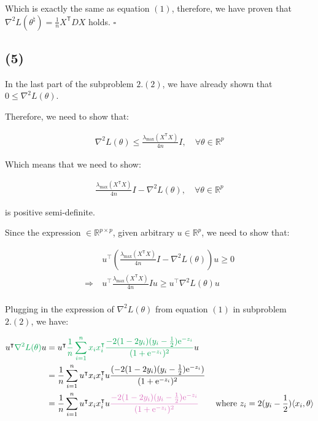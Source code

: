 \documentclass{article}
\begin{document}
Which is exactly the same as equation $(1)$, therefore, we have proven that $\nabla^2 L ( \theta^\natural ) = \frac{1}{n} X^{\mathsf{\scriptscriptstyle{T}}} D X$ holds. $\square$

\subsection*{(5)}

In the last part of the subproblem $2. (2)$, we have already shown that $0 \le \nabla^2 L (\theta)$.

Therefore, we need to show that:

\begin{align*}
    \nabla^2 L (\theta) \leq \frac{\lambda_{\max}( X^{\mathsf{\scriptscriptstyle{T}}} X )}{4 n } I, \quad \forall \theta \in \mathbb{R}^p
\end{align*}

Which means that we need to show:

\begin{align*}
    \frac{\lambda_{\max}( X^{\mathsf{\scriptscriptstyle{T}}} X )}{4 n } I - \nabla^2 L (\theta), \quad \forall \theta \in \mathbb{R}^p
\end{align*}

is positive semi-definite.
\bigskip

Since the expression $\in \mathbb{R}^{p \times p}$, 
given arbitrary $u \in \mathbb{R}^p$, we need to show that:

\begin{align*}
    &u^\intercal \left( \frac{\lambda_{\max}( X^{\mathsf{\scriptscriptstyle{T}}} X )}{4 n } I - \nabla^2 L (\theta) \right) u \geq 0 \\
    \Rightarrow \ &u^\intercal \frac{\lambda_{\max}( X^{\mathsf{\scriptscriptstyle{T}}} X )}{4 n } I u \geq u^\intercal \nabla^2 L (\theta) u \\
\end{align*}

Plugging in the expression of $\nabla^2 L (\theta)$ from equation $(1)$ in subproblem $2. (2)$, we have:

\begin{align*}
    u^\intercal \textcolor{Green}{\nabla^2 L (\theta)} u 
    &= u^\intercal \textcolor{Green}{\frac{1}{n} \sum_{i = 1}^n x_i x_i^\intercal  \frac{-2(1 - 2y_i)(y_i - \frac{1}{2})\mathrm{e}^{-z_i}}{(1 +\mathrm{e}^{-z_i})^2}} u \\
    &= \frac{1}{n} \sum_{i = 1}^n u^\intercal x_i x_i^\intercal u \frac{(-2(1 - 2y_i)(y_i - \frac{1}{2})\mathrm{e}^{-z_i})}{(1 +\mathrm{e}^{-z_i})^2} \\
    &= \frac{1}{n} \sum_{i = 1}^n u^\intercal x_i x_i^\intercal u \textcolor{Thistle}{\frac{-2(1 - 2y_i)(y_i - \frac{1}{2})\mathrm{e}^{-z_i}}{(1 +\mathrm{e}^{-z_i})^2}} \qquad \text{where } z_i = 2(y_i - \frac{1}{2})\langle x_i, \theta \rangle \\
\end{align*}
\end{document}
